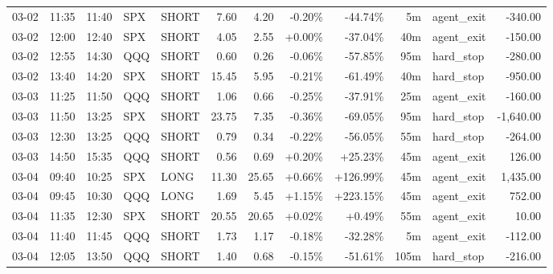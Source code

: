 \documentclass[11pt,a4paper,twoside]{article}
\begin{document}
\begin{center}
\begin{longtable}{>{\color{txtmain}}l l l l l r r r r r >{\color{txtmain}}l r}
03-02 & 11:35 & 11:40 & SPX & SHORT & 7.60 & 4.20 & \textcolor{lossred}{-0.20\%} & \textcolor{lossred}{-44.74\%} & 5m & agent\_exit & \textcolor{lossred}{-340.00} \\
03-02 & 12:00 & 12:40 & SPX & SHORT & 4.05 & 2.55 & \textcolor{wingreen}{+0.00\%} & \textcolor{lossred}{-37.04\%} & 40m & agent\_exit & \textcolor{lossred}{-150.00} \\
03-02 & 12:55 & 14:30 & QQQ & SHORT & 0.60 & 0.26 & \textcolor{lossred}{-0.06\%} & \textcolor{lossred}{-57.85\%} & 95m & hard\_stop & \textcolor{lossred}{-280.00} \\
03-02 & 13:40 & 14:20 & SPX & SHORT & 15.45 & 5.95 & \textcolor{lossred}{-0.21\%} & \textcolor{lossred}{-61.49\%} & 40m & hard\_stop & \textcolor{lossred}{-950.00} \\
03-03 & 11:25 & 11:50 & QQQ & SHORT & 1.06 & 0.66 & \textcolor{lossred}{-0.25\%} & \textcolor{lossred}{-37.91\%} & 25m & agent\_exit & \textcolor{lossred}{-160.00} \\
03-03 & 11:50 & 13:25 & SPX & SHORT & 23.75 & 7.35 & \textcolor{lossred}{-0.36\%} & \textcolor{lossred}{-69.05\%} & 95m & hard\_stop & \textcolor{lossred}{-1,640.00} \\
03-03 & 12:30 & 13:25 & QQQ & SHORT & 0.79 & 0.34 & \textcolor{lossred}{-0.22\%} & \textcolor{lossred}{-56.05\%} & 55m & hard\_stop & \textcolor{lossred}{-264.00} \\
03-03 & 14:50 & 15:35 & QQQ & SHORT & 0.56 & 0.69 & \textcolor{wingreen}{+0.20\%} & \textcolor{wingreen}{+25.23\%} & 45m & agent\_exit & \textcolor{wingreen}{126.00} \\
03-04 & 09:40 & 10:25 & SPX & LONG & 11.30 & 25.65 & \textcolor{wingreen}{+0.66\%} & \textcolor{wingreen}{+126.99\%} & 45m & agent\_exit & \textcolor{wingreen}{1,435.00} \\
03-04 & 09:45 & 10:30 & QQQ & LONG & 1.69 & 5.45 & \textcolor{wingreen}{+1.15\%} & \textcolor{wingreen}{+223.15\%} & 45m & agent\_exit & \textcolor{wingreen}{752.00} \\
03-04 & 11:35 & 12:30 & SPX & SHORT & 20.55 & 20.65 & \textcolor{wingreen}{+0.02\%} & \textcolor{wingreen}{+0.49\%} & 55m & agent\_exit & \textcolor{wingreen}{10.00} \\
03-04 & 11:40 & 11:45 & QQQ & SHORT & 1.73 & 1.17 & \textcolor{lossred}{-0.18\%} & \textcolor{lossred}{-32.28\%} & 5m & agent\_exit & \textcolor{lossred}{-112.00} \\
03-04 & 12:05 & 13:50 & QQQ & SHORT & 1.40 & 0.68 & \textcolor{lossred}{-0.15\%} & \textcolor{lossred}{-51.61\%} & 105m & hard\_stop & \textcolor{lossred}{-216.00} \\

\end{longtable}
\end{center}
\end{document}
